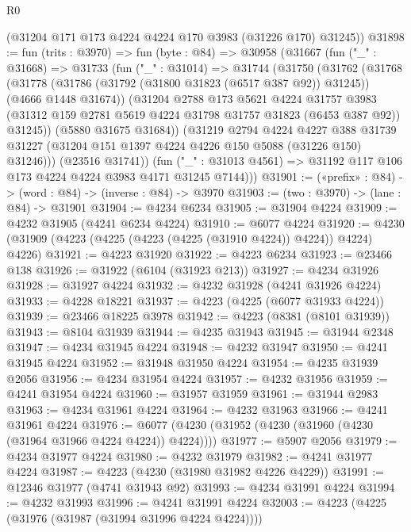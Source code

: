\begin{lexlean}{R0}
\begin{coremodule}
      (@31204 @171 @173 @4224 @4224 @170 @3983 (@31226 @170) @31245))
@31898 := fun (trits : @3970) =>
  fun (byte : @84) =>
  @30958
    (@31667
      (fun ("_" : @31668) =>
      @31733
        (fun ("_" : @31014) =>
        @31744
          (@31750
            (@31762
              (@31768
                (@31778
                  (@31786 (@31792 (@31800 @31823 (@6517 @387 @92)) @31245))
                  (@4666 @1448 @31674))
                (@31204
                  @2788
                  @173
                  @5621
                  @4224
                  @31757
                  @3983
                  (@31312 @159 @2781 @5619 @4224 @31798 @31757 @31823 (@6453 @387 @92))
                  @31245))
              (@5880 @31675 @31684))
            (@31219
              @2794
              @4224
              @4227
              @388
              @31739
              @31227
              (@31204 @151 @1397 @4224 @4226 @150 @5088 (@31226 @150) @31246)))
          (@23516 @31741))
        (fun ("_" : @31013 @4561) => @31192 @117 @106 @173 @4224 @4224 @3983 @4171 @31245 @7144)))
@31901 := («prefix» : @84) -> (word : @84) -> (inverse : @84) -> @3970
@31903 := (two : @3970) -> (lane : @84) -> @31901
@31904 := @4234 @6234
@31905 := @31904 @4224
@31909 := @4232 @31905 (@4241 @6234 @4224)
@31910 := @6077 @4224
@31920 := @4230 (@31909 (@4223 (@4225 (@4223 (@4225 (@31910 @4224)) @4224)) @4224) @4226)
@31921 := @4223 @31920
@31922 := @4223 @6234
@31923 := @23466 @138
@31926 := @31922 (@6104 (@31923 @213))
@31927 := @4234 @31926
@31928 := @31927 @4224
@31932 := @4232 @31928 (@4241 @31926 @4224)
@31933 := @4228 @18221
@31937 := @4223 (@4225 (@6077 @31933 @4224))
@31939 := @23466 @18225 @3978
@31942 := @4223 (@8381 (@8101 @31939))
@31943 := @8104 @31939
@31944 := @4235 @31943
@31945 := @31944 @2348
@31947 := @4234 @31945 @4224
@31948 := @4232 @31947
@31950 := @4241 @31945 @4224
@31952 := @31948 @31950 @4224
@31954 := @4235 @31939 @2056
@31956 := @4234 @31954 @4224
@31957 := @4232 @31956
@31959 := @4241 @31954 @4224
@31960 := @31957 @31959
@31961 := @31944 @2983
@31963 := @4234 @31961 @4224
@31964 := @4232 @31963
@31966 := @4241 @31961 @4224
@31976 := @6077 (@4230 (@31952 (@4230 (@31960 (@4230 (@31964 @31966 @4224 @4224)) @4224))))
@31977 := @5907 @2056
@31979 := @4234 @31977 @4224
@31980 := @4232 @31979
@31982 := @4241 @31977 @4224
@31987 := @4223 (@4230 (@31980 @31982 @4226 @4229))
@31991 := @12346 @31977 (@4741 @31943 @92)
@31993 := @4234 @31991 @4224
@31994 := @4232 @31993
@31996 := @4241 @31991 @4224
@32003 := @4223 (@4225 (@31976 (@31987 (@31994 @31996 @4224 @4224))))

\end{coremodule}
\end{lexlean}
